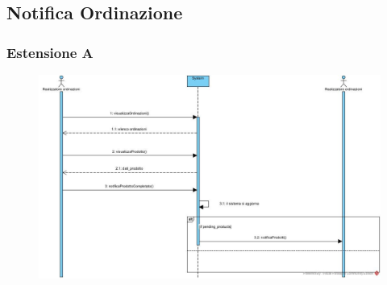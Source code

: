 \subsection{Notifica Ordinazione}
\subsubsection{Estensione A}
\begin{figure}[H]
	\centering
	\includegraphics[width=1\textwidth]{Immagini/SSD Notifica Ordinazione.jpg}
\end{figure}

